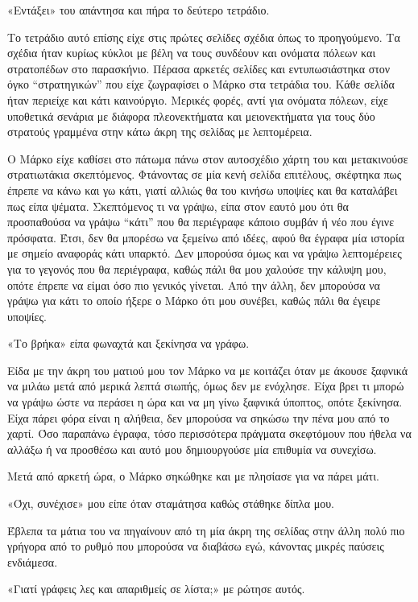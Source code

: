 \documentclass[12pt,twoside, openany]{book}
\begin{document}
«Εντάξει» του απάντησα και πήρα το δεύτερο τετράδιο.

Το τετράδιο αυτό επίσης είχε στις πρώτες σελίδες σχέδια όπως το προηγούμενο. Τα σχέδια ήταν κυρίως κύκλοι με βέλη να τους συνδέουν και ονόματα πόλεων και στρατοπέδων στο παρασκήνιο. Πέρασα αρκετές σελίδες και εντυπωσιάστηκα στον όγκο “στρατηγικών” που είχε ζωγραφίσει ο Μάρκο στα τετράδια του. Κάθε σελίδα ήταν περιείχε και κάτι καινούργιο. Μερικές φορές, αντί για ονόματα πόλεων, είχε υποθετικά σενάρια με διάφορα πλεονεκτήματα και μειονεκτήματα για τους δύο στρατούς γραμμένα στην κάτω άκρη της σελίδας με λεπτομέρεια.

Ο Μάρκο είχε καθίσει στο πάτωμα πάνω στον αυτοσχέδιο χάρτη του και μετακινούσε στρατιωτάκια σκεπτόμενος. Φτάνοντας σε μία κενή σελίδα επιτέλους, σκέφτηκα πως έπρεπε να κάνω και γω κάτι, γιατί αλλιώς θα του κινήσω υποψίες και θα καταλάβει πως είπα ψέματα. Σκεπτόμενος τι να γράψω, είπα στον εαυτό μου ότι θα προσπαθούσα να γράψω “κάτι” που θα περιέγραφε κάποιο συμβάν ή νέο που έγινε πρόσφατα. Έτσι, δεν θα μπορέσω να ξεμείνω από ιδέες, αφού θα έγραφα μία ιστορία με σημείο αναφοράς κάτι υπαρκτό. Δεν μπορούσα όμως και να γράψω λεπτομέρειες για το γεγονός που θα περιέγραφα, καθώς πάλι θα μου χαλούσε την κάλυψη μου, οπότε έπρεπε να είμαι όσο πιο γενικός γίνεται. Από την άλλη, δεν μπορούσα να γράψω για κάτι το οποίο ήξερε ο Μάρκο ότι μου συνέβει, καθώς πάλι θα έγειρε υποψίες.

«Το βρήκα» είπα φωναχτά και ξεκίνησα να γράφω.

Είδα με την άκρη του ματιού μου τον Μάρκο να με κοιτάζει όταν με άκουσε ξαφνικά να μιλάω μετά από μερικά λεπτά σιωπής, όμως δεν με ενόχλησε. Είχα βρει τι μπορώ να γράψω ώστε να περάσει η ώρα και να μη γίνω ξαφνικά ύποπτος, οπότε ξεκίνησα. Είχα πάρει φόρα είναι η αλήθεια, δεν μπορούσα να σηκώσω την πένα μου από το χαρτί. Όσο παραπάνω έγραφα, τόσο περισσότερα πράγματα σκεφτόμουν που ήθελα να αλλάξω ή να προσθέσω και αυτό μου δημιουργούσε μία επιθυμία να συνεχίσω.

Μετά από αρκετή ώρα, ο Μάρκο σηκώθηκε και με πλησίασε για να πάρει μάτι. 

«Όχι, συνέχισε» μου είπε όταν σταμάτησα καθώς στάθηκε δίπλα μου.

Έβλεπα τα μάτια του να πηγαίνουν από τη μία άκρη της σελίδας στην άλλη πολύ πιο γρήγορα από το ρυθμό που μπορούσα να διαβάσω εγώ, κάνοντας μικρές παύσεις ενδιάμεσα.

«Γιατί γράφεις λες και απαριθμείς σε λίστα;» με ρώτησε αυτός.
\end{document}
